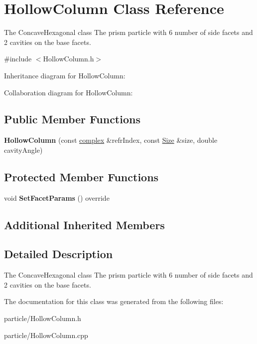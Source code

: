 \hypertarget{class_hollow_column}{}\section{Hollow\+Column Class Reference}
\label{class_hollow_column}


The Concave\+Hexagonal class The prism particle with 6 number of side facets and 2 cavities on the base facets.  




{\ttfamily \#include $<$Hollow\+Column.\+h$>$}



Inheritance diagram for Hollow\+Column\+:


Collaboration diagram for Hollow\+Column\+:
\subsection*{Public Member Functions}
\begin{DoxyCompactItemize}
\item 
\mbox{\label{class_hollow_column_ac03a1b9311904c85ffe890ec794401c1}} 
{\bfseries Hollow\+Column} (const \mbox{\hyperlink{classcomplex}{complex}} \&refr\+Index, const \mbox{\hyperlink{struct_size}{Size}} \&size, double cavity\+Angle)
\end{DoxyCompactItemize}
\subsection*{Protected Member Functions}
\begin{DoxyCompactItemize}
\item 
\mbox{\label{class_hollow_column_a91310788744ca94657fd8d483f955ccf}} 
void {\bfseries Set\+Facet\+Params} () override
\end{DoxyCompactItemize}
\subsection*{Additional Inherited Members}


\subsection{Detailed Description}
The Concave\+Hexagonal class The prism particle with 6 number of side facets and 2 cavities on the base facets. 

The documentation for this class was generated from the following files\+:\begin{DoxyCompactItemize}
\item 
particle/Hollow\+Column.\+h\item 
particle/Hollow\+Column.\+cpp\end{DoxyCompactItemize}
